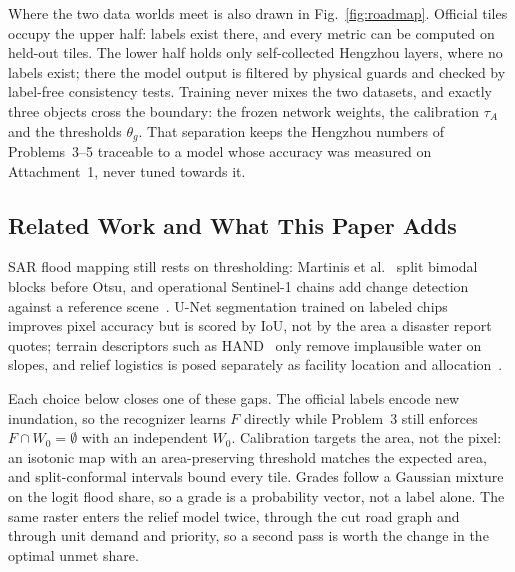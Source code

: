 Where the two data worlds meet is also drawn in Fig.~\ref{fig:roadmap}. Official tiles occupy the upper half: labels exist there, and every metric can be computed on held-out tiles. The lower half holds only self-collected Hengzhou layers, where no labels exist; there the model output is filtered by physical guards and checked by label-free consistency tests. Training never mixes the two datasets, and exactly three objects cross the boundary: the frozen network weights, the calibration $\tau_A$ and the thresholds $\theta_g$. That separation keeps the Hengzhou numbers of Problems~3--5 traceable to a model whose accuracy was measured on Attachment~1, never tuned towards it.

\subsection{Related Work and What This Paper Adds}

SAR flood mapping still rests on thresholding: Martinis et al.~\cite{martinis2009splitbased} split bimodal blocks before Otsu, and operational Sentinel-1 chains add change detection against a reference scene~\cite{twele2016sentinel1}. U-Net segmentation trained on labeled chips~\cite{ronneberger2015unet,bonafilia2020sen1floods11} improves pixel accuracy but is scored by IoU, not by the area a disaster report quotes; terrain descriptors such as HAND~\cite{nobre2011hand} only remove implausible water on slopes, and relief logistics is posed separately as facility location and allocation~\cite{balcik2008facility}.

Each choice below closes one of these gaps. The official labels encode new inundation, so the recognizer learns $F$ directly while Problem~3 still enforces $F\cap W_0=\emptyset$ with an independent $W_0$. Calibration targets the area, not the pixel: an isotonic map with an area-preserving threshold matches the expected area, and split-conformal intervals bound every tile. Grades follow a Gaussian mixture on the logit flood share, so a grade is a probability vector, not a label alone. The same raster enters the relief model twice, through the cut road graph and through unit demand and priority, so a second pass is worth the change in the optimal unmet share\cite{deepseek2026,qwen2026,doubao2026}.
